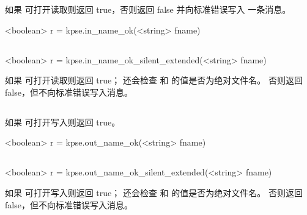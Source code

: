 
如果  可打开读取则返回 true，否则返回 false 并向标准错误写入
一条消息。

\begin{typing}
<boolean> r = kpse.in_name_ok(<string> fname)
\end{typing}

\subsection{}


\begin{typing}
<boolean> r = kpse.in_name_ok_silent_extended(<string> fname)
\end{typing}

如果  可打开读取则返回 true；
还会检查  和  的值是否为绝对文件名。
否则返回 false，但不向标准错误写入消息。

\subsection{}


如果  可打开写入则返回 true。

\begin{typing}
<boolean> r = kpse.out_name_ok(<string> fname)
\end{typing}

\subsection{}


\begin{typing}
<boolean> r = kpse.out_name_ok_silent_extended(<string> fname)
\end{typing}

如果  可打开写入则返回 true；
还会检查  和  的值是否为绝对文件名。
否则返回 false，但不向标准错误写入消息。

\subsection{}

